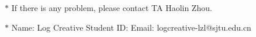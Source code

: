 \documentclass[12pt,a4paper]{article}
\theoremstyle{definition}
\begin{document}
	\noindent
	
	\noindent{}
	\begin{center}
		\footnotesize{\color{red}$*$ If there is any problem, please contact TA Haolin Zhou.}
		
		\footnotesize{\color{blue}$*$ Name: Log Creative \quad Student ID:  \quad Email: logcreative-lzl@sjtu.edu.cn}
		
	\end{center}
	
\end{document}
